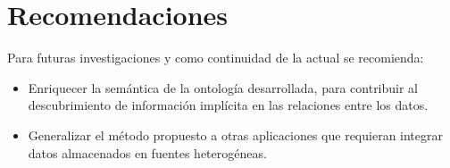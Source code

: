 \chapter*{\large Recomendaciones}

Para futuras investigaciones y como continuidad de la actual se recomienda:

\begin{itemize}
\item Enriquecer la semántica de la ontología desarrollada, para contribuir al descubrimiento de información implícita en las relaciones entre los datos.
\item Generalizar el método propuesto a otras aplicaciones que requieran integrar datos almacenados en fuentes heterogéneas.
\end{itemize}